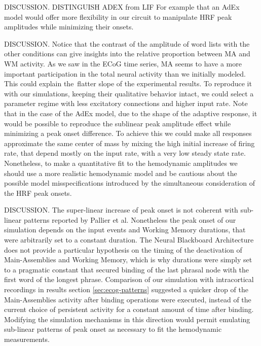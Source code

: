\documentclass[10pt]{article}
\begin{document}
DISCUSSION. DISTINGUISH ADEX from LIF
For example that an AdEx model would offer more flexibility in our circuit to manipulate HRF peak amplitudes while minimizing their onsets.




DISCUSSION. Notice that the contrast of the amplitude of word lists with the other conditions can give insights into the relative proportion between MA and WM activity.
As we saw in the ECoG time series, MA seems to have a more important participation in the total neural activity than we initially modeled.
This could explain the~flatter slope of the experimental results.
To reproduce it with our simulations, keeping their qualitative behavior intact, we could select a parameter regime with less excitatory connections and higher input rate.
Note that in the case of the AdEx model, due to the shape of the adaptive response, it would be possible to reproduce the sublinear peak amplitude effect while minimizing a peak onset difference.
To achieve this we could make all responses approximate the same center of mass by mixing the high initial increase of firing rate, that depend mostly on the input rate, with a very low steady state rate.
Nonetheless, to make a quantitative fit to the hemodynamic amplitudes we should use a more realistic hemodynamic model and be cautious about the possible model misspecifications introduced by the simultaneous consideration of the HRF peak onsets.


DISCUSSION. The super-linear increase of peak onset is not coherent with sub-linear patterns reported by Pallier et al.
Nonetheless the peak onset of our simulation depends on the input events and Working Memory durations, that were arbitrarily set to a constant duration.
The Neural Blackboard Architecture does not provide a particular hypothesis on the timing of the deactivation of Main-Assemblies and Working Memory, which is why durations were simply set to a pragmatic constant that secured binding of the last phrasal node with the first word of the longest phrase.
Comparison of our simulation with intracortical recordings in results section \ref{sec:ecog-patterns} suggested a quicker drop of the Main-Assemblies activity after binding operations were executed, instead of the current choice of persistent activity for a constant amount of time after binding.
Modifying the simulation mechanisms in this direction would permit emulating sub-linear patterns of peak onset as necessary to fit the hemodynamic measurements.
\end{document}
